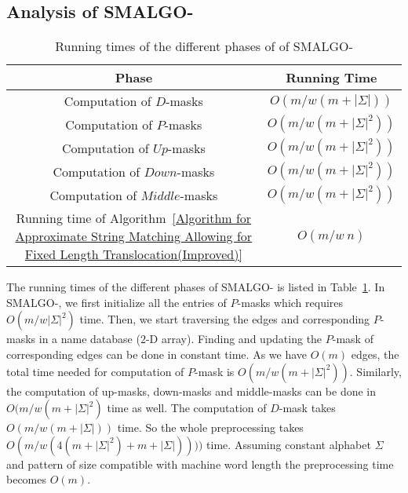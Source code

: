 \documentclass{llncs}
\newcommand{\rom}[1]{\uppercase\expandafter{\romannumeral #1\relax}}
\begin{document}
{\subsection{Analysis of SMALGO-\rom{2}}\label{analysis}



\begin{table}
\begin{center}
\begin{tabular}{|c|c|}
\hline
Phase&Running Time\\
\hline
Computation of $D$-masks&$O(m/w(m+|\Sigma|))$\\
\hline
Computation of $P$-masks&$O(m/w (m+{\vert\Sigma\vert}^{2}))$\\
\hline
Computation of $Up$-masks&$O(m/w (m+{\vert\Sigma\vert}^{2}))$\\
\hline
Computation of $Down$-masks&$O(m/w (m+{\vert\Sigma\vert}^{2}))$\\
\hline
Computation of $Middle$-masks&$O(m/w (m+{\vert\Sigma\vert}^{2}))$\\
\hline
Running time of Algorithm~\ref{Algorithm for Approximate String Matching Allowing for Fixed Length Translocation(Improved)}&$O(m/w ~n)$\\
\hline
\end{tabular}
\caption{Running times of the different phases of of SMALGO-\rom{2}}
\label{Table_RunningTime2}
\end{center}
\end{table}




The running times of the different phases of SMALGO-\rom{2} is listed in Table~\ref{Table_RunningTime2}. In SMALGO-\rom{2}, we first initialize all the entries of $P$-masks which requires $O(m/w {\vert\Sigma\vert}^{2})$ time. Then, we start traversing the edges and corresponding $P$-masks in a name database ($2$-D array). Finding and updating the $P$-mask of corresponding edges can be done in constant time. As we have $O(m)$ edges, the total time needed for computation of $P$-mask is $O(m/w (m + {\vert\Sigma\vert}^{2}))$. 
Similarly, the computation of up-masks, down-masks and middle-masks can be done in $O(m/w (m + {\vert\Sigma\vert}^{2})$ time as well. The computation of $D$-mask takes $O(m/w (m + {\vert\Sigma\vert}))$ time.
So the whole preprocessing takes $O(m/w (4(m + {\vert\Sigma\vert}^{2}) + m + {\vert\Sigma\vert}))))$ time. Assuming constant alphabet $\Sigma$ and pattern of size compatible with machine word length the preprocessing time becomes $O(m)$.


}
\end{document}
